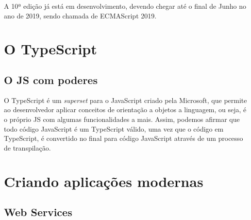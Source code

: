\documentclass[
	12pt,				%
	openright,			%
	twoside,			%
	a4paper,			%
	english,			%
	brazil				%
	]{abntex2}
\begin{document}
A 10ª edição já está em desenvolvimento, devendo chegar até o final de Junho no ano de 2019, sendo chamada de ECMAScript 2019.



\part{O TypeScript}
\chapter{O JS com poderes}

O TypeScript é um \textit{superset} para o JavaScript criado pela Microsoft, que  permite ao desenvolvedor aplicar conceitos de orientação a objetos a linguagem, ou seja, é o próprio JS com algumas funcionalidades a mais. Assim, podemos afirmar que todo código JavaScript é um TypeScript válido, uma vez que o código em TypeScript, é convertido no final para código JavaScript através de um processo de transpilação.



\part{Criando aplicações modernas}
\chapter{Web Services}


\end{document}
